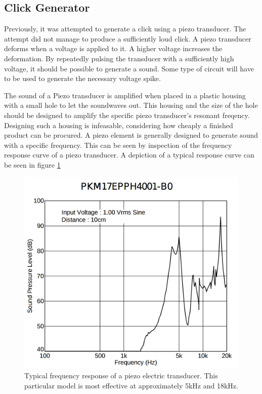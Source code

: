 \subsection{Click Generator} %
\label{sub:click_generator}
Previously, it was attempted to generate a click using a piezo transducer.
The attempt did not manage to produce a sufficiently loud click.
A piezo transducer deforms when a voltage is applied to it.
A higher voltage increases the deformation.
By repeatedly pulsing the transducer with a sufficiently high voltage, it should be possible to generate a sound.
Some type of circuit will have to be used to generate the necessary voltage spike.

The sound of a Piezo transducer is amplified when placed in a plastic housing with a small hole to let the soundwaves out.
This housing and the size of the hole should be designed to amplify the specific piezo transducer's resonant freqency.
Designing such a housing is infeasable, considering how cheaply a finished product can be procured.
A piezo element is generally designed to generate sound with a specific frequency.
This can be seen by inspection of the frequency response curve of a piezo transducer.
A depiction of a typical response curve can be seen in figure \ref{fig:piezo_response}

\begin{figure}[H]
	\centering
	\includegraphics[width=.5\linewidth]{graphics/piezo_response.png}
	\caption{Typical frequency response of a piezo electric transducer. This particular model is most effective at approximately 5kHz and 18kHz.}
	\label{fig:piezo_response}
\end{figure}


